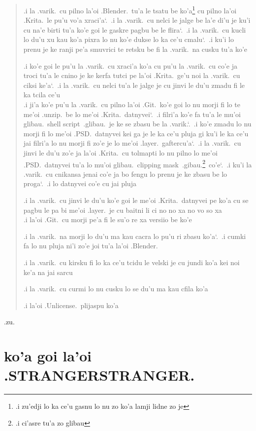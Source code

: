 \documentclass{report}
\newcommand\sds{\spacefactor\sfcode`.\ \space}
\begin{document}
\begin{quote}
	.i la .varik.\ cu pilno la'oi .Blender.\ tu'a le tsatu be ko'a\footnote{.i zu'edji lo ka ce'u gasnu lo nu zo ko'a lamji lidne zo je} cu pilno la'oi .Krita.\ le pu'u vo'a xraci'a\sds  .i la .varik.\ cu nelci le jalge be la'e di'u je ku'i cu na'e birti tu'a ko'e goi le gaskre pagbu be le flira\sds  .i la .varik.\ cu kucli lo du'u xu kau ko'a pixra lo nu ko'e dukse lo ka ce'u cmalu\sds  .i ku'i lo prenu je ke ranji pe'a smuvrici te retsku be fi la .varik.\ na cusku tu'a ko'e

	.i ko'e goi le pu'u la .varik.\ cu xraci'a ko'a cu pu'u la .varik.\ cu co'e ja troci tu'a le cnino je ke kerfa tutci pe la'oi .Krita.\ ge'u noi la .varik.\ cu ciksi ke'a\sds  .i la .varik.\ cu nelci tu'a le jalge je cu jinvi le du'u zmadu fi le ka tcila ce'u \\
	.i ji'a ko'e pu'u la .varik.\ cu pilno la'oi .Git.\ ko'e goi lo nu morji fi lo te me'oi .unzip.\ be lo me'oi .Krita.\ datnyvei\sds  .i filri'a ko'e fa tu'a le mu'oi glibau.\ shell script\ .glibau.\ je ke se zbasu be la .varik.\sds  .i ko'e zmadu lo nu morji fi lo me'oi .PSD.\ datnyvei kei ga je le ka ce'u pluja gi ku'i le ka ce'u jai filri'a lo nu morji fi zo'e je lo me'oi .layer.\ gaftercu'a\sds  .i la .varik.\ cu jinvi le du'u zo'e ja la'oi .Krita.\ cu tolmapti lo nu pilno lo me'oi .PSD.\ datnyvei tu'a lo mu'oi glibau.\ clipping mask\ .gibau.\footnote{.i ci'asre tu'a zo glibau}\ co'e\sds  .i ku'i la .varik.\ cu cnikansa jenai co'e ja bo fengu lo prenu je ke zbasu be lo proga\sds  .i lo datnyvei co'e cu jai pluja

	.i la .varik.\ cu jinvi le du'u ko'e goi le me'oi .Krita.\ datnyvei pe ko'a cu se pagbu le pa bi me'oi .layer.\ je cu baitni li ci no no xa no vo so xa \\
	.i la'oi .Git.\ cu morji pe'a fi le su'o re xa versiio be ko'e

	.i la .varik.\ na morji lo du'u ma kau cacra lo pu'u ri zbasu ko'a\sds  .i cumki fa lo nu pluja ni'i zo'e joi tu'a la'oi .Blender.

	.i la .varik.\ cu kirsku fi lo ka ce'u tcidu le velski je cu jundi ko'a kei noi ke'a na jai sarcu

	.i la .varik.\ cu curmi lo nu cusku lo se du'u ma kau cfila ko'a

	.i la'oi .Unlicense.\ plijaspu ko'a
\end{quote}

.zu.

\chapter{ko'a goi la'oi .STRANGERSTRANGER.}
\end{document}
